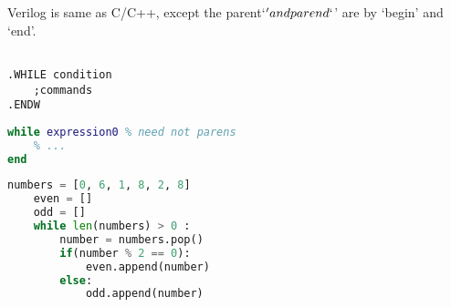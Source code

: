 


Verilog is same as C/C++, except the parent`\(' and parend`\)' are by `begin' and `end'.


\lstset{style=GlobalASMx86}
\begin{lstlisting}[language={[x86masm]Assembler}]

.WHILE condition
	;commands
.ENDW
\end{lstlisting}

\begin{lstlisting}[language=MATLAB]
while expression0 % need not parens
	% ...
end
\end{lstlisting}

\begin{lstlisting}[language=Python]
	numbers = [0, 6, 1, 8, 2, 8]
	even = []
	odd = []
	while len(numbers) > 0 :
		number = numbers.pop()
		if(number % 2 == 0):
			even.append(number)
		else:
			odd.append(number)
\end{lstlisting}